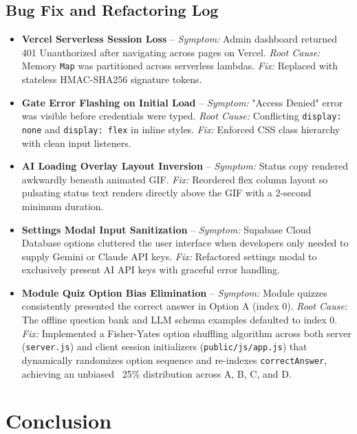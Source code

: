 \documentclass[12pt,a4paper]{article}
\begin{document}
\subsection{Bug Fix and Refactoring Log}
\begin{itemize}[leftmargin=1.5em, itemsep=5pt]
    \item \textbf{Vercel Serverless Session Loss} -- \textit{Symptom:} Admin dashboard returned 401 Unauthorized after navigating across pages on Vercel. \textit{Root Cause:} Memory \texttt{Map} was partitioned across serverless lambdas. \textit{Fix:} Replaced with stateless HMAC-SHA256 signature tokens.
    \item \textbf{Gate Error Flashing on Initial Load} -- \textit{Symptom:} "Access Denied" error was visible before credentials were typed. \textit{Root Cause:} Conflicting \texttt{display: none} and \texttt{display: flex} in inline styles. \textit{Fix:} Enforced CSS class hierarchy with clean input listeners.
    \item \textbf{AI Loading Overlay Layout Inversion} -- \textit{Symptom:} Status copy rendered awkwardly beneath animated GIF. \textit{Fix:} Reordered flex column layout so pulsating status text renders directly above the GIF with a 2-second minimum duration.
    \item \textbf{Settings Modal Input Sanitization} -- \textit{Symptom:} Supabase Cloud Database options cluttered the user interface when developers only needed to supply Gemini or Claude API keys. \textit{Fix:} Refactored settings modal to exclusively present AI API keys with graceful error handling.
    \item \textbf{Module Quiz Option Bias Elimination} -- \textit{Symptom:} Module quizzes consistently presented the correct answer in Option A (index 0). \textit{Root Cause:} The offline question bank and LLM schema examples defaulted to index 0. \textit{Fix:} Implemented a Fisher-Yates option shuffling algorithm across both server (\texttt{server.js}) and client session initializers (\texttt{public/js/app.js}) that dynamically randomizes option sequence and re-indexes \texttt{correctAnswer}, achieving an unbiased ~25\% distribution across A, B, C, and D.
\end{itemize}

\newpage

\section{Conclusion}
\end{document}
